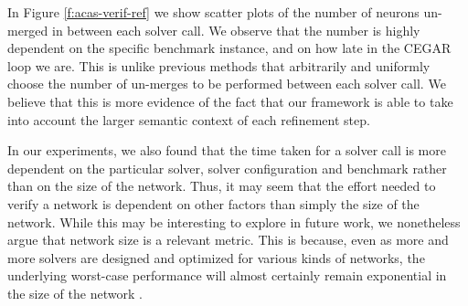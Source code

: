 In Figure \ref{f:acas-verif-ref} we show scatter plots of the number of neurons
un-merged in between each solver call. We observe that the number is highly
dependent on the specific benchmark instance,
and on how late in the CEGAR loop we are. This is unlike previous methods
that arbitrarily and uniformly choose the number of un-merges
\cite{cegar-nn} to be performed between each solver call. We believe
that this is more evidence of the fact that our framework is able to take into
account the larger semantic context of each refinement step. 

In our experiments, we also found that the time taken for a solver call is more
dependent on the particular solver, solver configuration and benchmark rather
than on the size of the network. Thus, it may seem that the effort needed to
verify a network is dependent on other factors than simply the size of the
network. While this may be interesting to explore in future work, we nonetheless
argue that network size is a relevant metric. This is because, even as more and
more solvers are designed and optimized for various kinds of networks, the
underlying worst-case performance will almost certainly remain exponential in
the size of the network
\cite{reluplex}.

